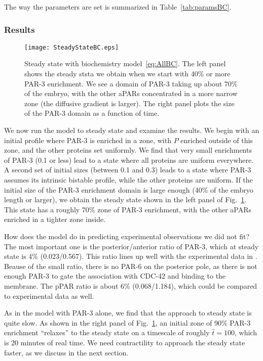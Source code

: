 \documentclass[11pt]{article}
\newcommand{\6}[1]{#1_{\text{6}}}
\newcommand{\3}[1]{#1_{\text{3}}}
\begin{document}
The way the parameters are set is summarized in Table\ \ref{tab:paramsBC}.

\subsubsection{Results}
\begin{figure}
\centering
\texttt{[image: SteadyStateBC.eps]}
\caption{\label{fig:BCSS}Steady state with biochemistry model\ \eqref{eq:AllBC}. The left panel shows the steady ststa we obtain when we start with 40\% or more PAR-3 enrichment. We see a domain of PAR-3 taking up about 70\% of the embryo, with the other aPARs concentrated in a more narrow zone (the diffusive gradient is larger). The right panel plots the size of the PAR-3 domain as a function of time.}
\end{figure}

We now run the model to steady state and examine the results. We begin with an initial profile where PAR-3 is enriched in a zone, with $P$ enriched outside of this zone, and the other proteins set uniformly. We find that very small enrichments of PAR-3 (0.1 or less) lead to a state where all proteins are uniform everywhere. A second set of initial sizes (between 0.1 and 0.3) leads to a state where PAR-3 assumes its intrinsic bistable profile, while the other proteins are uniform. If the initial size of the PAR-3 enrichment domain is large enough (40\% of the embryo length or larger), we obtain the steady state shown in the left panel of Fig.\ \ref{fig:BCSS}. This state has a roughly 70\% zone of PAR-3 enrichment, with the other aPARs enriched in a tighter zone inside. 

How does the model do in predicting experimental observations we did not fit? The most important one is the posterior/anterior ratio of PAR-3, which at steady state is 4\% (0.023/0.567). This ratio lines up well with the experimental data in \cite[Fig.~4C]{sailer2015dynamic}. Beause of the small ratio, there is no PAR-6 on the posterior pole, as there is not enough PAR-3 to gate the association with CDC-42 and binding to the membrane. The pPAR ratio is about 6\% (0.068/1.184), which could be compared to experimental data as well.

As in the model with PAR-3 alone, we find that the approach to steady state is quite slow. As shown in the right panel of Fig.\ \ref{fig:BCSS}, an initial zone of 90\% PAR-3 enrichment ``relaxes'' to the steady state on a timescale of roughly $\hat t = 100$, which is 20 minutes of real time. We need contractility to approach the steady state faster, as we discuss in the next section.
\end{document}
